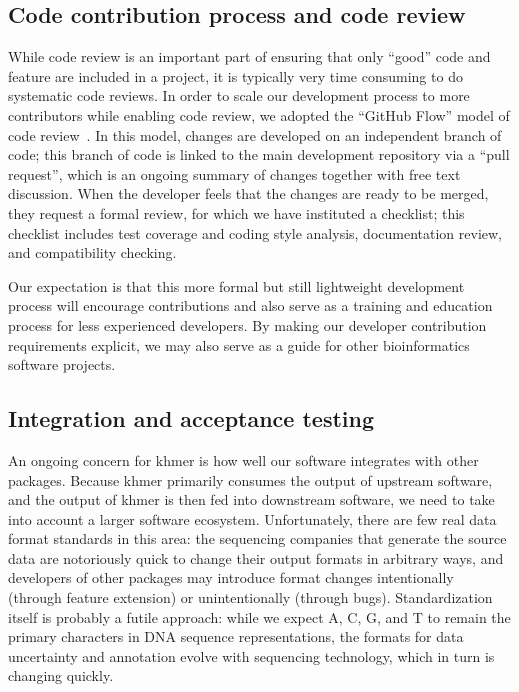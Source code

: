 \documentclass[12pt]{article}
\begin{document}

\subsection{Code contribution process and code review}

While code review is an important part of ensuring that only ``good''
code and feature are included in a project, it is typically very time
consuming to do systematic code reviews.  In order to scale our
development process to more contributors while enabling code review,
we adopted the ``GitHub Flow'' model of code review~\cite{GitHubFlow}.
In this model, changes are developed on an independent branch
of code; this branch of code is linked to the main development
repository via a ``pull request'', which is an ongoing summary of
changes together with free text discussion.  When the developer feels
that the changes are ready to be merged, they request a formal review,
for which we have instituted a checklist; this checklist includes test
coverage and coding style analysis, documentation review, and
compatibility checking.

Our expectation is that this more formal but still lightweight
development process will encourage contributions and also serve as a
training and education process for less experienced developers.  By
making our developer contribution requirements explicit, we may also
serve as a guide for other bioinformatics software projects.

\subsection{Integration and acceptance testing}

An ongoing concern for khmer is how well our software integrates with
other packages.  Because khmer primarily consumes the output of
upstream software, and the output of khmer is then fed into downstream
software, we need to take into account a larger software ecosystem.
Unfortunately, there are few real data format standards in this area:
the sequencing companies that generate the source data are notoriously
quick to change their output formats in arbitrary ways, and developers
of other packages may introduce format changes intentionally (through
feature extension) or unintentionally (through bugs).  Standardization
itself is probably a futile approach: while we expect A, C, G, and
T to remain the primary characters in DNA sequence representations,
the formats for data uncertainty and annotation evolve with
sequencing technology, which in turn is changing quickly.
\end{document}

